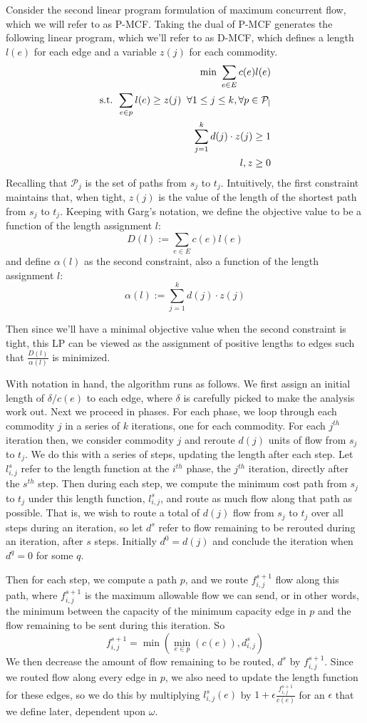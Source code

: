 Consider the second linear program formulation of maximum
concurrent flow, which we will refer to as P-MCF. Taking the dual of
P-MCF generates the following linear program, which we'll refer to as D-MCF, which defines a length
$l(e)$ for each edge and a variable $z(j)$ for each commodity.
\begin{align*}
\text{min     } \sum_{e\in E}c(e)l(e) \\
\text{s.t. }\sum_{e\in p}l(e) \geq z(j) \;\;\forall 1\leq j \leq k,
\forall p \in \cal{P}_j\\
\sum_{j=1}^kd(j)\cdot z(j)\geq 1\\
l,z\geq 0
\end{align*}
Recalling that $\mathcal{P}_j$ is the set of paths from $s_j$ to
$t_j$. Intuitively, the first constraint maintains that, when tight, $z(j)$ is the
value of the length of the shortest path from $s_j$ to $t_j$. Keeping
with Garg's notation, we define the objective value to be a function
of the length assignment $l$:
$$D(l) := \sum_{e\in E} c(e)l(e)$$
and define $\alpha(l)$ as the second constraint, also a function of the length assignment $l$:
$$\alpha(l) := \sum_{j=1}^k d(j)\cdot z(j)$$

Then since we'll have a minimal objective value when the second
constraint is tight, this LP can be viewed as the assignment of
positive lengths to edges such that $\frac{D(l)}{\alpha(l)}$ is
minimized. 

With notation in hand, the algorithm runs as follows. We first assign
an initial length of $\delta/c(e)$ to each edge, where $\delta$ is carefully picked
to make the analysis work out. Next we proceed in phases. For each
phase, we loop through each commodity $j$ in a series of $k$
iterations, one for each commodity. For each $j^{th}$ iteration then, we
consider commodity $j$ and reroute $d(j)$ units of flow from $s_j$ to
$t_j$. We do this with a series of steps, updating the length after each step. Let $l_{i,j}^s$ refer to the
length function at the $i^{th}$ phase, the $j^{th}$ iteration,
directly after the $s^{th}$ step. Then during each step, we compute the minimum cost
path from $s_j$ to $t_j$ under this length function, $l_{i,j}^s$, and route as much
flow along that path as possible. That is, we wish to route a total of
$d(j)$ flow from $s_j$ to $t_j$ over all steps during an iteration, so
let $d^s$ refer to flow remaining to be rerouted during an
iteration, after $s$ steps. Initially $d^0=d(j)$ and conclude the
iteration when $d^q=0$ for some $q$. 

Then for each step, we compute a path $p$,
and we route $f_{i,j}^{s+1}$ flow along this path, where
$f_{i,j}^{s+1}$ is the maximum allowable flow we can send, or in other
words, the minimum between the capacity of the minimum capacity edge
in $p$ and the flow remaining to be sent during this iteration. So
$$f_{i,j}^{s+1}=\min(\min_{e\in p}(c(e)),d_{i,j}^s)$$
We then decrease the amount of flow remaining to be routed, $d^s$ by
$f_{i,j}^{s+1}$. Since we routed flow along every edge in $p$, we also
need to update the length function for these edges, so we do this by
multiplying $l_{i,j}^s(e)$ by $1+\epsilon \frac{f_{i,j}^{s+1}}{c(e)}$ for an
$\epsilon$ that we define later, dependent upon $\omega$. 

